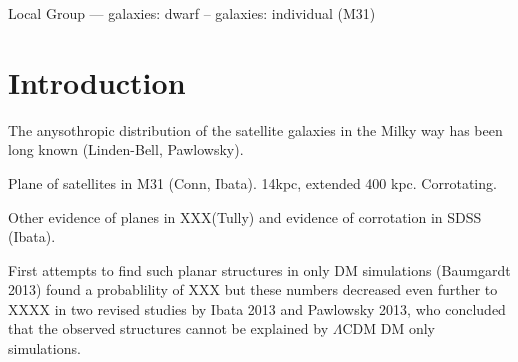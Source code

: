 \documentclass[useAMS,usenatbib]{mn2e}
\begin{document}
\date{Accepted xxx. Received xxxx; in original form xxxx}

\pagerange{\pageref{firstpage}--\pageref{lastpage}} 

\maketitle

\label{firstpage}

\begin{abstract}

\end{abstract}

\begin{keywords}
Local Group --- galaxies: dwarf -- galaxies: individual (M31)  
\end{keywords}

\section{Introduction}

The anysothropic distribution of the satellite galaxies in the Milky
way has been long known (Linden-Bell, Pawlowsky).

Plane of satellites in M31 (Conn, Ibata). 14kpc, extended 400 kpc.
Corrotating.
   
Other evidence of planes in XXX(Tully) and evidence of corrotation in
SDSS (Ibata).

First attempts to find such planar structures in only DM simulations
(Baumgardt 2013) found a probablility of XXX but these numbers
decreased even further to XXXX in two revised studies by Ibata 2013
and Pawlowsky 2013, who concluded that the observed structures cannot
be explained by $\Lambda$CDM DM only simulations.
\end{document}
